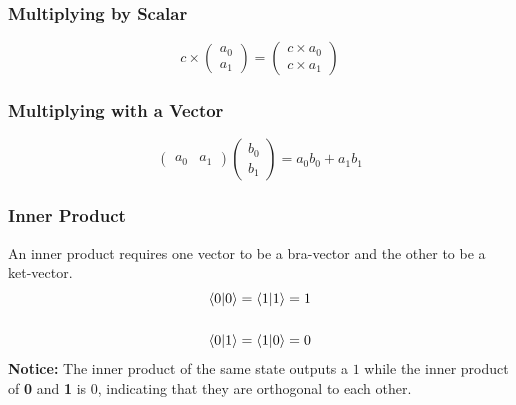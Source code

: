 \documentclass[hidelinks, a4paper, 12pt]{article}
\newcommand{\bd}{\textbf}
\newcommand{\n}{\\[\baselineskip]}
\begin{document}
            \subsubsection{Multiplying by Scalar}
                \[c \times \begin{pmatrix} a_0 \\ a_1 \end{pmatrix} = \begin{pmatrix} c \times a_0 \\ c \times a_1 \end{pmatrix}\]

            \subsubsection{Multiplying with a Vector}
                \[\begin{pmatrix} a_0 & a_1 \end{pmatrix} \begin{pmatrix} b_0 \\ b_1 \end{pmatrix} = a_0 b_0 + a_1 b_1\]
            
            \subsubsection{Inner Product}
                An inner product requires one vector to be a bra-vector and the other to be a ket-vector.
                \[\begin{split}
                    \braket{0|0} = \braket{1|1} = 1\n
                    \braket{0|1} = \braket{1|0} = 0
                \end{split}\]
                \bd{Notice:} The inner product of the same state outputs a $1$ while the inner product of \bd{0} and \bd{1} is $0$, indicating that they are orthogonal to each other. 
\end{document}
